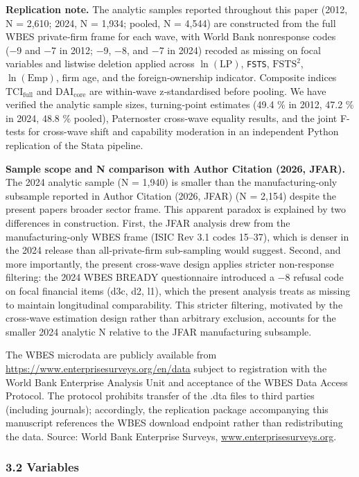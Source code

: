 \documentclass[12pt,a4paper]{article}
\begin{document}
\textbf{Replication note.} The analytic samples reported throughout this
paper (2012, N = 2,610; 2024, N = 1,934; pooled, N = 4,544) are
constructed from the full WBES private‑firm frame for each wave, with
World Bank nonresponse codes (−9 and −7 in 2012; −9, −8, and −7 in 2024)
recoded as missing on focal variables and listwise deletion applied
across \(\ln(\mathrm{LP})\), \texttt{FSTS}, \(\mathrm{FSTS}^2\),
\(\ln(\mathrm{Emp})\), firm age, and the foreign‑ownership indicator.
Composite indices \(\mathrm{TCI}_{\text{full}}\) and
\(\mathrm{DAI}_{\text{core}}\) are within‑wave z‑standardised before
pooling. We have verified the analytic sample sizes, turning‑point
estimates (49.4 \% in 2012, 47.2 \% in 2024, 48.8 \% pooled),
Paternoster cross‑wave equality results, and the joint F-tests for
cross-wave shift and capability moderation in an independent Python
replication of the Stata pipeline.

\textbf{Sample scope and N comparison with Author Citation (2026,
JFAR).} The 2024 analytic sample (N = 1,940) is smaller than the
manufacturing-only subsample reported in Author Citation (2026, JFAR) (N
= 2,154) despite the present paper\textquotesingle s broader sector
frame. This apparent paradox is explained by two differences in
construction. First, the JFAR analysis drew from the manufacturing-only
WBES frame (ISIC Rev 3.1 codes 15--37), which is denser in the 2024
release than all-private-firm sub-sampling would suggest. Second, and
more importantly, the present cross-wave design applies stricter
non-response filtering: the 2024 WBES BREADY questionnaire introduced a
−8 refusal code on focal financial items (d3c, d2, l1), which the
present analysis treats as missing to maintain longitudinal
comparability. This stricter filtering, motivated by the cross-wave
estimation design rather than arbitrary exclusion, accounts for the
smaller 2024 analytic N relative to the JFAR manufacturing subsample.

The WBES microdata are publicly available from
\url{https://www.enterprisesurveys.org/en/data} subject to registration
with the World Bank Enterprise Analysis Unit and acceptance of the WBES
Data Access Protocol. The protocol prohibits transfer of the .dta files
to third parties (including journals); accordingly, the replication
package accompanying this manuscript references the WBES download
endpoint rather than redistributing the data. Source: World Bank
Enterprise Surveys,
\href{http://www.enterprisesurveys.org}{www.enterprisesurveys.org}.

\hypertarget{32-variables}{%
\subsubsection{3.2 Variables}\label{32-variables}}
\end{document}
